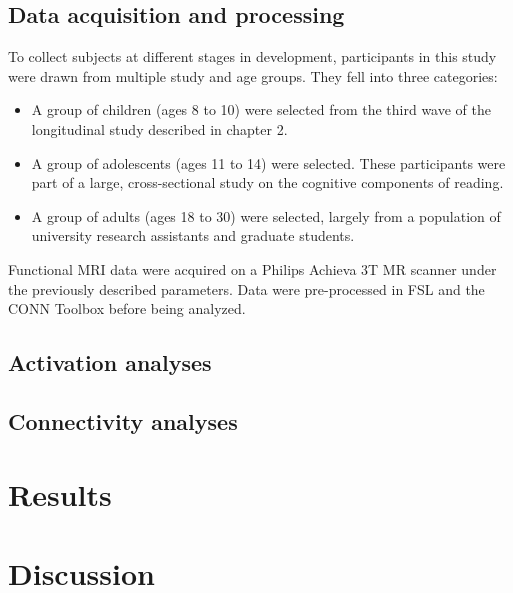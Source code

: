 \subsection{Data acquisition and processing}

To collect subjects at different stages in development, participants in this study were drawn from multiple study and age groups. They fell into three categories:

\begin{itemize}
	\item A group of children (ages 8 to 10) were selected from the third wave of the longitudinal study described in chapter 2. 
	\item A group of adolescents (ages 11 to 14) were selected. These participants were part of a large, cross-sectional study on the cognitive components of reading.
	\item A group of adults (ages 18 to 30) were selected, largely from a population of university research assistants and graduate students.
\end{itemize}

Functional MRI data were acquired on a Philips Achieva 3T MR scanner under the previously described parameters. Data were pre-processed in FSL and the CONN Toolbox before being analyzed.

\subsection{Activation analyses}



\subsection{Connectivity analyses}


\section{Results}


\section{Discussion}


